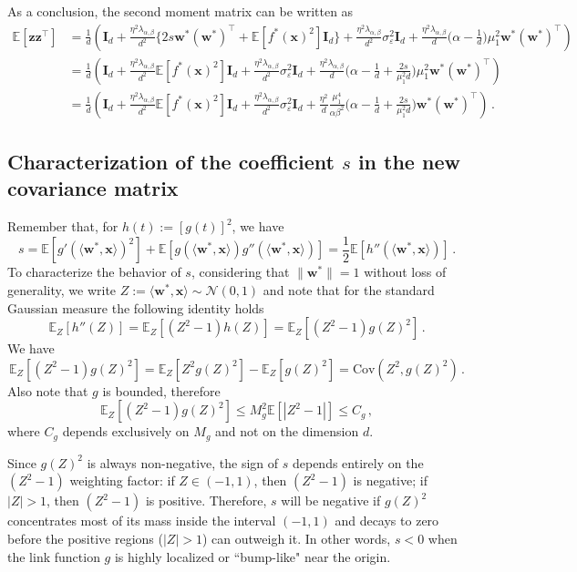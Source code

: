 As a conclusion, the second moment matrix can be written as
\begin{align*}
    \mathbb E[\bm z\bm z^\top] &= \frac{1}{d} \left(\bm I_d + \frac{\eta^2\lambda_{\alpha, \beta}}{d^2} \Big\{2 s \bm w^*(\bm w^*)^\top + \mathbb E[f^*(\bm x)^2]\bm I_d\Big\} + \frac{\eta^2\lambda_{\alpha, \beta}}{d^2}\sigma_\varepsilon^2 \bm I_d  + \frac{\eta^2\lambda_{\alpha, \beta}}{d}\Big(\alpha - \frac{1}{d}\Big) \mu_1^2\bm w^* (\bm w^*)^\top\right)\\
    &= \frac{1}{d} \left(\bm I_d + \frac{\eta^2\lambda_{\alpha, \beta}}{d^2} \mathbb E[f^*(\bm x)^2]\bm I_d + \frac{\eta^2\lambda_{\alpha, \beta}}{d^2}\sigma_\varepsilon^2 \bm I_d  + \frac{\eta^2\lambda_{\alpha, \beta}}{d}\Big(\alpha - \frac{1}{d} + \frac{2s}{\mu_1^2d}\Big) \mu_1^2\bm w^* (\bm w^*)^\top\right)\\
    &=\frac{1}{d}\left(\bm I_d + \frac{\eta^2\lambda_{\alpha, \beta}}{d^2}\mathbb E[f^*(\bm x)^2]\bm I_d  +\frac{\eta^2\lambda_{\alpha, \beta}}{d^2}\sigma_\varepsilon^2 \bm I_d + \frac{\eta^2}{d}\frac{\mu_1^4}{\alpha \beta^2}\Big(\alpha - \frac{1}{d} + \frac{2s}{\mu_1^2d}\Big) \bm w^* (\bm w^*)^\top\right)\, . 
\end{align*}

\subsection{Characterization of the coefficient $s$ in the new covariance matrix}\label{app:spike-coef}

Remember that, for $h(t) := [g(t)]^2$, we have
\[
    s = \mathbb E[g'(\langle \bm w^*,\bm x\rangle)^2]+ \mathbb E[g(\langle \bm w^*,\bm x\rangle)g''(\langle \bm w^*,\bm x\rangle)] = \frac{1}{2}\mathbb E[h''(\langle \bm w^*, \bm x\rangle)]\, .
\]
To characterize the behavior of $s$, considering that $\|\bm w^*\| = 1$ without loss of generality, we write $ Z:= \langle \bm w^*, \bm x\rangle \sim \mathcal N(0, 1)$ and note that for the standard Gaussian measure the following identity holds
\[
    \mathbb E_Z[h''(Z)] = \mathbb E_Z[(Z^2 - 1) h(Z)] = \mathbb E_Z[(Z^2 - 1) g(Z)^2]\, .
\]
We have
\[
    \mathbb E_Z[(Z^2 - 1) g(Z)^2] = \mathbb E_Z[Z^2g(Z)^2] - \mathbb E_Z[g(Z)^2] = \text{Cov}(Z^2, g(Z)^2)\, .
\]
Also note that $g$ is bounded, therefore
\[
    \mathbb E_Z[(Z^2 - 1) g(Z)^2] \leq M^2_g\mathbb E[|Z^2 - 1|] \leq C_g\, ,
\]
where $C_g$ depends exclusively on $M_g$ and not on the dimension $d$.

Since $g(Z)^2$ is always non-negative, the sign of $s$ depends entirely on the $(Z^2 - 1)$ weighting factor: if $Z \in (-1, 1)$, then $(Z^2 - 1)$ is negative; if $|Z| > 1$, then $(Z^2 - 1)$ is positive. Therefore, $s$ will be negative if  $g(Z)^2$ concentrates most of its mass inside the interval $(-1, 1)$ and decays to zero before the positive regions ($|Z| > 1$) can outweigh it. In other words, $s < 0$ when the link function $g$ is highly localized or ``bump-like" near the origin.

